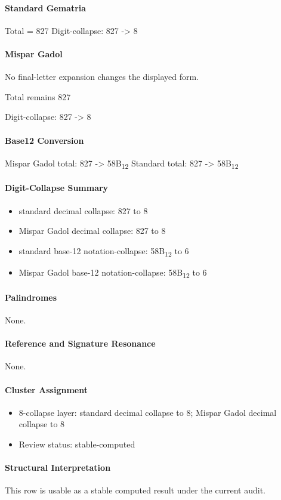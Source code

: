 \paragraph{Standard Gematria}
Total = 827
Digit-collapse: 827 -> 8
\paragraph{Mispar Gadol}
No final-letter expansion changes the displayed form.

Total remains 827

Digit-collapse: 827 -> 8
\paragraph{Base12 Conversion}
Mispar Gadol total: 827 -> 58B\textsubscript{12}
Standard total: 827 -> 58B\textsubscript{12}
\paragraph{Digit-Collapse Summary}
\begin{itemize}
\item standard decimal collapse: 827 to 8
\item Mispar Gadol decimal collapse: 827 to 8
\item standard base-12 notation-collapse: 58B\textsubscript{12} to 6
\item Mispar Gadol base-12 notation-collapse: 58B\textsubscript{12} to 6
\end{itemize}
\paragraph{Palindromes}
None.
\paragraph{Reference and Signature Resonance}
None.
\paragraph{Cluster Assignment}
\begin{itemize}
\item 8-collapse layer: standard decimal collapse to 8; Mispar Gadol decimal collapse to 8
\item Review status: stable-computed
\end{itemize}
\paragraph{Structural Interpretation}
This row is usable as a stable computed result under the current audit.

